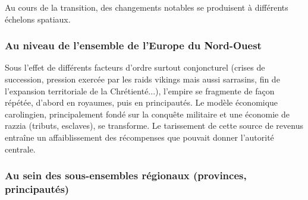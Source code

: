 Au cours de la transition, des changements notables se produisent à différents échelons spatiaux.

\subsubsection{Au niveau de l'ensemble de l'Europe du Nord-Ouest}

Sous l'effet de différents facteurs d'ordre surtout conjoncturel (crises de succession, pression exercée par les raids vikings mais aussi sarrasins, fin de l'expansion territoriale de la Chrétienté...), l'empire se fragmente de façon répétée, d'abord en royaumes, puis en principautés.
Le modèle économique carolingien, principalement fondé sur la conquête militaire et une économie de razzia (tributs, esclaves), se transforme.
Le tarissement de cette source de revenus entraîne un affaiblissement des récompenses que pouvait donner l'autorité centrale.


\subsubsection{Au sein des sous-ensembles régionaux (provinces, principautés)}

